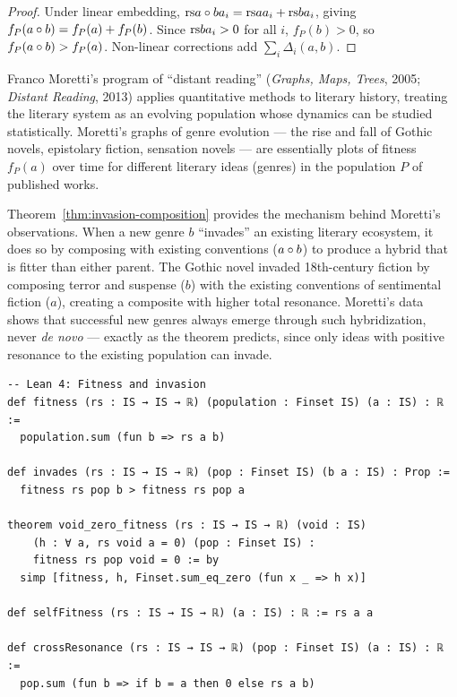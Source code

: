 \begin{proof}
Under linear embedding, $\mathrm{rs}{a \circ b}{a_i} = \mathrm{rs}{a}{a_i} + \mathrm{rs}{b}{a_i}$,
giving $f_P(a \circ b) = f_P(a) + f_P(b)$.  Since $\mathrm{rs}{b}{a_i} > 0$ for
all $i$, $f_P(b) > 0$, so $f_P(a \circ b) > f_P(a)$.  Non-linear
corrections add $\sum_i \Delta_i(a, b)$.
\end{proof}

\begin{interpretation}
\label{interp:ch17:moretti_distant_reading}
Franco Moretti's program of ``distant reading'' (\textit{Graphs, Maps, Trees},
2005; \textit{Distant Reading}, 2013) applies quantitative methods to
literary history, treating the literary system as an evolving population
whose dynamics can be studied statistically.  Moretti's graphs of genre
evolution --- the rise and fall of Gothic novels, epistolary fiction,
sensation novels --- are essentially plots of fitness $f_P(a)$ over time
for different literary ideas (genres) in the population $P$ of published
works.

Theorem~\ref{thm:invasion-composition} provides the mechanism behind
Moretti's observations.  When a new genre $b$ ``invades'' an existing
literary ecosystem, it does so by composing with existing conventions
($a \circ b$) to produce a hybrid that is fitter than either parent.
The Gothic novel invaded 18th-century fiction by composing terror and
suspense ($b$) with the existing conventions of sentimental fiction ($a$),
creating a composite with higher total resonance.  Moretti's data shows
that successful new genres always emerge through such hybridization,
never \textit{de novo} --- exactly as the theorem predicts, since only
ideas with positive resonance to the existing population can invade.
\end{interpretation}

\begin{lstlisting}
-- Lean 4: Fitness and invasion
def fitness (rs : IS → IS → ℝ) (population : Finset IS) (a : IS) : ℝ :=
  population.sum (fun b => rs a b)

def invades (rs : IS → IS → ℝ) (pop : Finset IS) (b a : IS) : Prop :=
  fitness rs pop b > fitness rs pop a

theorem void_zero_fitness (rs : IS → IS → ℝ) (void : IS)
    (h : ∀ a, rs void a = 0) (pop : Finset IS) :
    fitness rs pop void = 0 := by
  simp [fitness, h, Finset.sum_eq_zero (fun x _ => h x)]

def selfFitness (rs : IS → IS → ℝ) (a : IS) : ℝ := rs a a

def crossResonance (rs : IS → IS → ℝ) (pop : Finset IS) (a : IS) : ℝ :=
  pop.sum (fun b => if b = a then 0 else rs a b)
\end{lstlisting}

